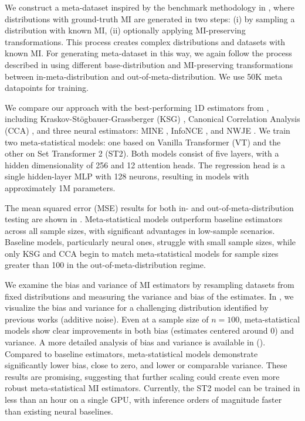 We construct a meta-dataset inspired by the benchmark methodology in \cite{NEURIPS2023_36b80eae}, where distributions with ground-truth MI are generated in two steps: (i) by sampling a distribution with known MI, (ii) optionally applying MI-preserving transformations. This process creates complex distributions and datasets with known MI. For generating meta-dataset in this way, we again follow the process described in  using different base-distribution and MI-preserving transformations between in-meta-distribution and out-of-meta-distribution. We use 50K meta datapoints for training.


We compare our approach with the best-performing 1D estimators from \cite{NEURIPS2023_36b80eae}, including Kraskov-St\"ogbauer-Grassberger (KSG) \cite{PhysRevE.69.066138}, Canonical Correlation Analysis (CCA) \cite{pml2Book}, and three neural estimators: MINE \cite{pmlr-v80-belghazi18a}, InfoNCE \cite{repr_learning}, and NWJE \cite{NIPS2007_72da7fd6, NIPS2016_cedebb6e, pmlr-v97-poole19a}. We train two meta-statistical models: one based on Vanilla Transformer (VT) and the other on Set Transformer 2 (ST2). Both models consist of five layers, with a hidden dimensionality of 256 and 12 attention heads. The regression head is a single hidden-layer MLP with 128 neurons, resulting in models with approximately 1M parameters.


The mean squared error (MSE) results for both in- and out-of-meta-distribution testing are shown in . Meta-statistical models outperform baseline estimators across all sample sizes, with significant advantages in low-sample scenarios. Baseline models, particularly neural ones, struggle with small sample sizes, while only KSG and CCA begin to match meta-statistical models for sample sizes greater than 100 in the out-of-meta-distribution regime.

We examine the bias and variance of MI estimators by resampling datasets from fixed distributions and measuring the variance and bias of the estimates. In , we visualize the bias and variance for a challenging distribution identified by previous works \cite{NEURIPS2023_36b80eae} (additive noise). Even at a sample size of $n = 100$, meta-statistical models show clear improvements in both bias (estimates centered around 0) and variance. A more detailed analysis of bias and variance is available in  (). Compared to baseline estimators, meta-statistical models demonstrate significantly lower bias, close to zero, and lower or comparable variance. These results are promising, suggesting that further scaling could create even more robust meta-statistical MI estimators. Currently, the ST2 model can be trained in less than an hour on a single GPU, with inference orders of magnitude faster than existing neural baselines.


